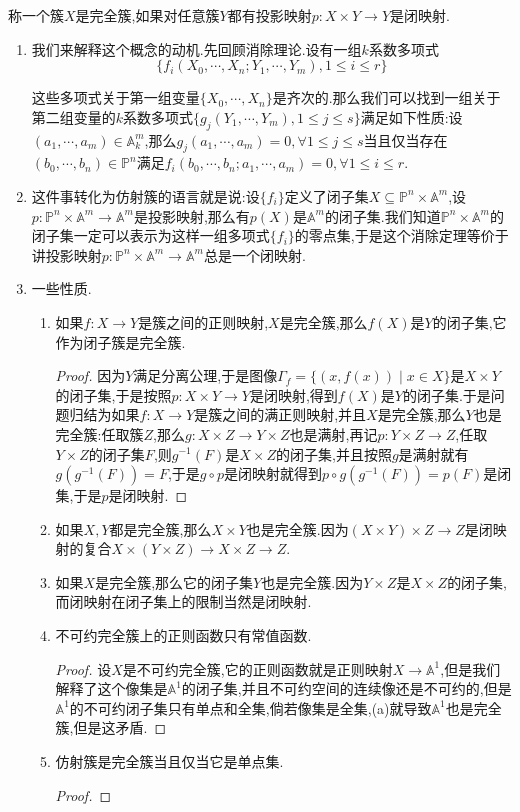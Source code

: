 称一个簇$X$是完全簇,如果对任意簇$Y$都有投影映射$p:X\times Y\to Y$是闭映射.
\begin{enumerate}
	\item 我们来解释这个概念的动机.先回顾消除理论.设有一组$k$系数多项式
	$$\{f_i(X_0,\cdots,X_n;Y_1,\cdots,Y_m),1\le i\le r\}$$
	
	这些多项式关于第一组变量$\{X_0,\cdots,X_n\}$是齐次的.那么我们可以找到一组关于第二组变量的$k$系数多项式$\{g_j(Y_1,\cdots,Y_m),1\le j\le s\}$满足如下性质:设$(a_1,\cdots,a_m)\in\mathbb{A}_k^m$,那么$g_j(a_1,\cdots,a_m)=0,\forall1\le j\le s$当且仅当存在$(b_0,\cdots,b_n)\in\mathbb{P}^n$满足$f_i(b_0,\cdots,b_n;a_1,\cdots,a_m)=0,\forall1\le i\le r$.
	\item 这件事转化为仿射簇的语言就是说:设$\{f_i\}$定义了闭子集$X\subseteq\mathbb{P}^n\times\mathbb{A}^m$,设$p:\mathbb{P}^n\times\mathbb{A}^m\to\mathbb{A}^m$是投影映射,那么有$p(X)$是$\mathbb{A}^m$的闭子集.我们知道$\mathbb{P}^n\times\mathbb{A}^m$的闭子集一定可以表示为这样一组多项式$\{f_i\}$的零点集,于是这个消除定理等价于讲投影映射$p:\mathbb{P}^n\times\mathbb{A}^m\to\mathbb{A}^m$总是一个闭映射.
	\item 一些性质.
	\begin{enumerate}
		\item 如果$f:X\to Y$是簇之间的正则映射,$X$是完全簇,那么$f(X)$是$Y$的闭子集,它作为闭子簇是完全簇.
		\begin{proof}
			
			因为$Y$满足分离公理,于是图像$\Gamma_f=\{(x,f(x))\mid x\in X\}$是$X\times Y$的闭子集,于是按照$p:X\times Y\to Y$是闭映射,得到$f(X)$是$Y$的闭子集.于是问题归结为如果$f:X\to Y$是簇之间的满正则映射,并且$X$是完全簇,那么$Y$也是完全簇:任取簇$Z$,那么$g:X\times Z\to Y\times Z$也是满射,再记$p:Y\times Z\to Z$,任取$Y\times Z$的闭子集$F$,则$g^{-1}(F)$是$X\times Z$的闭子集,并且按照$g$是满射就有$g(g^{-1}(F))=F$,于是$g\circ p$是闭映射就得到$p\circ g(g^{-1}(F))=p(F)$是闭集,于是$p$是闭映射.
		\end{proof}
		\item 如果$X,Y$都是完全簇,那么$X\times Y$也是完全簇.因为$(X\times Y)\times Z\to Z$是闭映射的复合$X\times(Y\times Z)\to X\times Z\to Z$.
		\item 如果$X$是完全簇,那么它的闭子集$Y$也是完全簇.因为$Y\times Z$是$X\times Z$的闭子集,而闭映射在闭子集上的限制当然是闭映射.
		\item 不可约完全簇上的正则函数只有常值函数.
		\begin{proof}
			
			设$X$是不可约完全簇,它的正则函数就是正则映射$X\to\mathbb{A}^1$,但是我们解释了这个像集是$\mathbb{A}^1$的闭子集,并且不可约空间的连续像还是不可约的,但是$\mathbb{A}^1$的不可约闭子集只有单点和全集,倘若像集是全集,(a)就导致$\mathbb{A}^1$也是完全簇,但是这矛盾.
		\end{proof}
		\item 仿射簇是完全簇当且仅当它是单点集.
		\begin{proof}
			

\end{proof}
\end{enumerate}
\end{enumerate}
